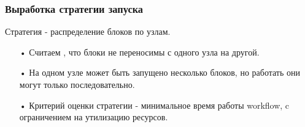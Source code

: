 \documentclass[10pt,pdf,hyperref={unicode}]{beamer}
\begin{document}
\begin{frame}
\frametitle{Выработка стратегии запуска}

Стратегия - распределение блоков по узлам.
\begin{enumerate}
\item[•] Считаем , что блоки не переносимы с одного узла на другой.
\item[•] На одном узле может быть запущено несколько блоков, но работать они могут только последовательно.
\item[•] Критерий оценки стратегии - минимальное время работы workflow, c ограничением на утилизацию ресурсов.
\end{enumerate}
\end{frame}
\end{document}

